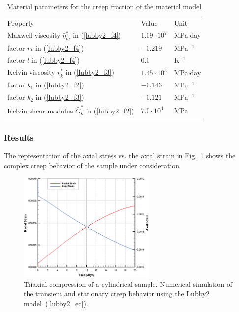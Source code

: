 \begin{table}[!htb]
\centering
\begin{tabular}{lll}
\hline\hline\noalign{\smallskip}
Property & Value & Unit \\
\noalign{\smallskip}\hline\noalign{\smallskip}
Maxwell viscosity ${\bar\eta}^{\ast}_m$ in (\ref{lubby2_f4})  & $1.09\cdot 10^7$ & MPa$\cdot$day \\
factor $m$ in (\ref{lubby2_f4})                               & $-0.219$         & MPa$^{-1}$    \\
factor $l$ in (\ref{lubby2_f4})                               & $0.0$            & K$^{-1}$      \\
Kelvin viscosity ${\bar\eta}^{\ast}_k$ in (\ref{lubby2_f3})   & $1.45\cdot 10^5$ & MPa$\cdot$day \\
factor $k_1$ in (\ref{lubby2_f2})                             & $-0.146$         & MPa$^{-1}$    \\
factor $k_2$ in (\ref{lubby2_f3})                             & $-0.121$         & MPa$^{-1}$    \\
Kelvin shear modulus ${\bar G}^{\ast}_k$ in (\ref{lubby2_f2}) & $7.0\cdot 10^4$  & MPa           \\
\noalign{\smallskip}\hline\hline
\end{tabular}
\caption{Material parameters for the creep fraction of the material model}
\label{matpar_lubby2_2}
\end{table}


\subsubsection*{Results}

The representation of the axial stress vs. the axial strain in Fig.~\ref{triax_res_lubby2} shows the complex creep behavior of the sample under consideration.

\begin{figure}[!htb]
\begin{center}
\includegraphics[width=0.6\textwidth]{M/figure/creep/svvcreep_e_HL_strain.eps}
\end{center}
\caption{Triaxial compression of a cylindrical sample. Numerical simulation of the transient and stationary creep behavior using the Lubby2 model~(\ref{lubby2_ec}).} 
\label{triax_res_lubby2}
\end{figure}

